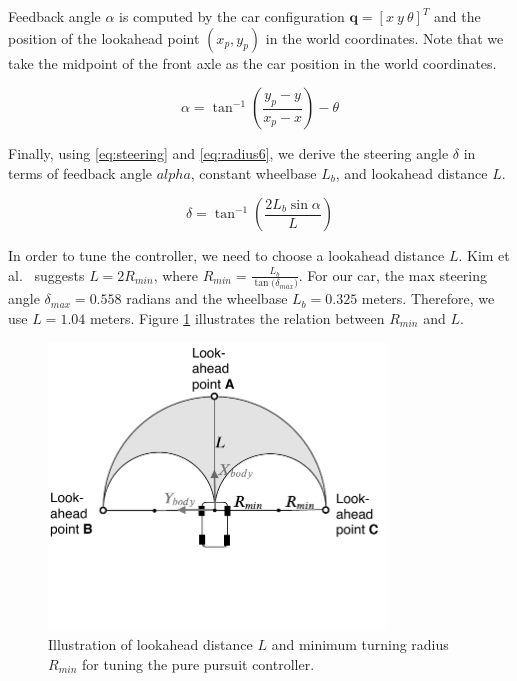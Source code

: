 Feedback angle $\alpha$ is computed by the car configuration $\textbf{q} = [x\
y\ \theta]^T$ and the position of the lookahead point $(x_p, y_p)$ in the world
coordinates. Note that we take the midpoint of the front axle as the car
position in the world coordinates.

\begin{equation}
  \alpha = \tan^{-1}(\frac{y_p - y}{x_p - x}) - \theta
  \label{eq:alpha}
\end{equation}

Finally, using \eqref{eq:steering} and \eqref{eq:radius6}, we derive the
steering angle $\delta$ in terms of feedback angle $alpha$, constant wheelbase
$L_b$, and lookahead distance $L$.

\begin{equation}
  \delta = \tan^{-1}(\frac{2L_b\sin\alpha}{L})
  \label{eq:delta}
\end{equation}

In order to tune the controller, we need to choose a lookahead distance $L$.
Kim et al.\ \cite{Kim2013SensorbasedMP} suggests $L = 2R_{min}$, where $R_{min}
= \frac{L_b}{\tan({\delta_{max})}}$. For our car, the max steering angle
$\delta_{max} = 0.558$ radians and the wheelbase $L_b = 0.325$ meters.
Therefore, we use $L = 1.04$ meters. Figure \ref{figure:lookahead} illustrates
the relation between $R_{min}$ and $L$.

\begin{figure}[h]
  \centering
  \includegraphics[width=0.8\textwidth]{figures/pure-pursuit-lookahead.pdf}
  \caption[Pure pursuit controller tuning]{Illustration of lookahead distance
  $L$ and minimum turning radius $R_{min}$ for tuning the pure pursuit
  controller.}
  \label{figure:lookahead}
\end{figure}

